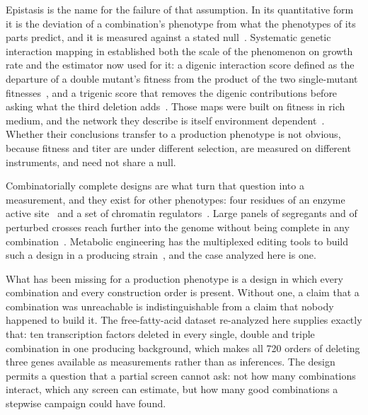 Epistasis is the name for the failure of that assumption. In its quantitative form it is
the deviation of a combination's phenotype from what the phenotypes of its parts predict,
and it is measured against a stated null~\citep{domingoCausesConsequencesGenetic2019}.
Systematic genetic interaction mapping in  established both
the scale of the phenomenon on growth rate and the estimator now used for it: a digenic
interaction score defined as the departure of a double mutant's fitness from the product of
the two single-mutant
fitnesses~\citep{costanzoGlobalGeneticInteraction2016,baryshnikovaQuantitativeAnalysisFitness2010},
and a trigenic score that removes the digenic contributions before asking what the third
deletion adds~\citep{kuzminSystematicAnalysisComplex2018}. Those maps were built on fitness
in rich medium, and the network they describe is itself environment
dependent~\citep{costanzoEnvironmentalRobustnessGlobal2021}. Whether their conclusions
transfer to a production phenotype is not obvious, because fitness and titer are under
different selection, are measured on different instruments, and need not share a null.

Combinatorially complete designs are what turn that question into a measurement, and they
exist for other phenotypes: four residues of an enzyme active
site~\citep{johnstonCombinatoriallyCompleteEpistatic2024} and a set of chromatin
regulators~\citep{alcantarHighthroughputSyntheticBiology2024}. Large panels of segregants
and of perturbed crosses reach further into the genome without being complete in any
combination~\citep{goldsteinGlobalEpistasisBudding2025,matsuiInterplayAdditivityDominance2022}.
Metabolic engineering has the multiplexed editing tools to build such a design in a
producing strain~\citep{lianCombinatorialMetabolicEngineering2017}, and the case analyzed
here is one.

What has been missing for a production phenotype is a design in which every combination and
every construction order is present. Without one, a claim that a combination was
unreachable is indistinguishable from a claim that nobody happened to build it. The
free-fatty-acid dataset re-analyzed here supplies exactly that: ten transcription factors
deleted in every single, double and triple combination in one producing background, which
makes all 720 orders of deleting three genes available as measurements rather than as
inferences. The design permits a question that a partial screen cannot ask: not how many
combinations interact, which any screen can estimate, but how many good combinations a
stepwise campaign could have found.
